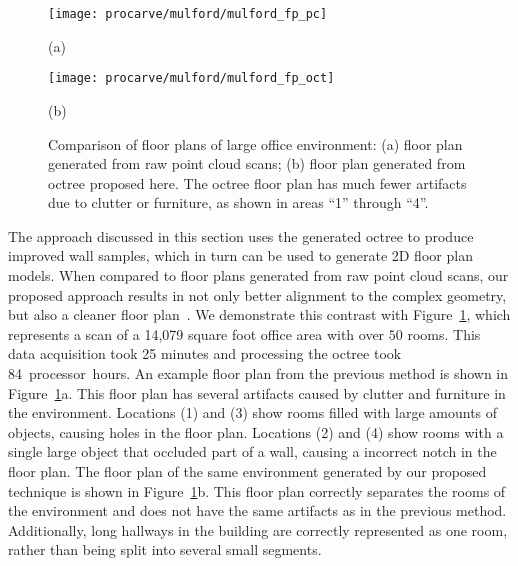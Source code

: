 \documentclass[12pt,onecolumn,oneside]{book}
\begin{document}
\begin{figure}[t]

	\centering
	\begin{minipage}[t]{1.0\linewidth}
		\centerline{\texttt{[image: procarve/mulford/mulford\_fp\_pc]}}
		\centerline{(a)}
	\end{minipage}

	\begin{minipage}[t]{1.0\linewidth}
		\centerline{\texttt{[image: procarve/mulford/mulford\_fp\_oct]}}
		\centerline{(b)}
	\end{minipage}

	\caption[Comparison of floor plans of large office environment.]{Comparison of floor plans of large office environment: (a) floor plan generated from raw point cloud scans; (b) floor plan generated from octree proposed here.  The octree floor plan has much fewer artifacts due to clutter or furniture, as shown in areas ``1'' through ``4''.}
	\label{fig:compare_fp_mulford}

\end{figure}

The approach discussed in this section uses the generated octree to produce improved wall samples, which in turn can be used to generate 2D floor plan models.  When compared to floor plans generated from raw point cloud scans, our proposed approach results in not only better alignment to the complex geometry, but also a cleaner floor plan~\cite{Turner14}.  We demonstrate this contrast with Figure~\ref{fig:compare_fp_mulford}, which represents a scan of a 14,079 square foot office area with over $50$ rooms.  This data acquisition took 25 minutes and processing the octree took 84~processor~hours.  An example floor plan from the previous method is shown in Figure~\ref{fig:compare_fp_mulford}a.  This floor plan has several artifacts caused by clutter and furniture in the environment.  Locations (1) and (3) show rooms filled with large amounts of objects, causing holes in the floor plan.  Locations (2) and (4) show rooms with a single large object that occluded part of a wall, causing a incorrect notch in the floor plan.  The floor plan of the same environment generated by our proposed technique is shown in Figure~\ref{fig:compare_fp_mulford}b.  This floor plan correctly separates the rooms of the environment and does not have the same artifacts as in the previous method.  Additionally, long hallways in the building are correctly represented as one room, rather than being split into several small segments.
\end{document}
